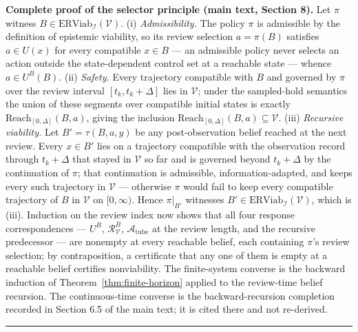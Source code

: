 \documentclass[11pt]{article}
\theoremstyle{definition}
\begin{document}
\noindent\textbf{Complete proof of the selector principle (main text, Section 8).}
Let \(\pi\) witness \(B \in \mathrm{ERViab}_{\mathcal{I}}(\mathcal{V})\).
(i) \emph{Admissibility.} The policy \(\pi\) is admissible by the
definition of epistemic viability, so its review selection
\(a = \pi(B)\) satisfies \(a \in U(x)\) for every compatible
\(x \in B\) --- an admissible policy never selects an action outside the
state-dependent control set at a reachable state --- whence
\(a \in U^{B}(B)\). (ii) \emph{Safety.} Every trajectory compatible with
\(B\) and governed by \(\pi\) over the review interval \([t_{k},
t_{k} + \Delta]\) lies in \(\mathcal{V}\); under the sampled-hold
semantics the union of these segments over compatible initial states is
exactly \(\mathrm{Reach}_{[0,\Delta]}(B, a)\), giving the inclusion
\(\mathrm{Reach}_{[0,\Delta]}(B, a) \subseteq \mathcal{V}\). (iii)
\emph{Recursive viability.} Let \(B' = \tau(B, a, y)\) be any
post-observation belief reached at the next review. Every \(x \in B'\)
lies on a trajectory compatible with the observation record through
\(t_{k} + \Delta\) that stayed in \(\mathcal{V}\) so far and is governed
beyond \(t_{k} + \Delta\) by the continuation of \(\pi\); that
continuation is admissible, information-adapted, and keeps every such
trajectory in \(\mathcal{V}\) --- otherwise \(\pi\) would fail to keep
every compatible trajectory of \(B\) in \(\mathcal{V}\) on
\([0, \infty)\). Hence \(\pi|_{B'}\) witnesses
\(B' \in \mathrm{ERViab}_{\mathcal{I}}(\mathcal{V})\), which is (iii).
Induction on the review index now shows that all four response
correspondences --- \(U^{B}\), \(\mathcal{R}_{\mathcal{V}}^{B}\),
\(\mathcal{A}_{\mathrm{tube}}\) at the review length, and the recursive
predecessor --- are nonempty at every reachable belief, each containing
\(\pi\)'s review selection; by contraposition, a certificate that any
one of them is empty at a reachable belief certifies nonviability. The
finite-system converse is the backward induction of
Theorem~\ref{thm:finite-horizon} applied to the review-time belief
recursion. The continuous-time converse is the backward-recursion
completion recorded in Section 6.5 of the main text; it is cited there
and not re-derived. \rule{0.5\linewidth}{0.5pt}
\end{document}
